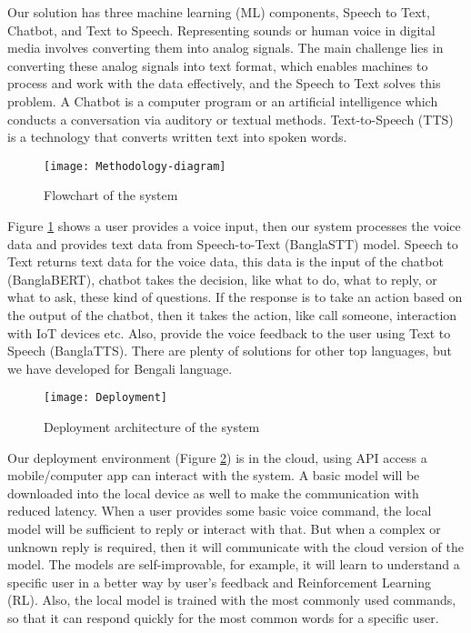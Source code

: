 Our solution has three machine learning (ML) components, Speech to Text, Chatbot, and Text to Speech.
Representing sounds or human voice in digital media involves converting them into analog signals.
The main challenge lies in converting these analog signals into text format, which enables machines to process and work with the data effectively, and the Speech to Text solves this problem\cite{speech-recog-bengali}.
A Chatbot is a computer program or an artificial intelligence which conducts a conversation via auditory or textual methods\cite{chatbot}.
Text-to-Speech (TTS) is a technology that converts written text into spoken words\cite{text-to-speech}.

\begin{figure}
    \centering
    \texttt{[image: Methodology-diagram]}
    \caption{Flowchart of the system}\label{fig:methodology}
\end{figure}

Figure \ref{fig:methodology} shows a user provides a voice input, then our system processes the voice data and provides text data from Speech-to-Text (BanglaSTT)\cite{bangla-stt} model.
Speech to Text returns text data for the voice data, this data is the input of the chatbot (BanglaBERT)\cite{bangla-bert}, chatbot takes the decision, like what to do, what to reply, or what to ask, these kind of questions.
If the response is to take an action based on the output of the chatbot, then it takes the action, like call someone, interaction with IoT devices etc.
Also, provide the voice feedback to the user using Text to Speech (BanglaTTS)\cite{bangla-tts}.
There are plenty of solutions for other top languages, but we have developed for Bengali language.

\begin{figure}
    \centering
    \texttt{[image: Deployment]}
    \caption{Deployment architecture of the system}\label{fig:deployment}
\end{figure}

Our deployment environment (Figure \ref{fig:deployment}) is in the cloud, using API access a mobile/computer app can interact with the system.
A basic model will be downloaded into the local device as well to make the communication with reduced latency.
When a user provides some basic voice command, the local model will be sufficient to reply or interact with that.
But when a complex or unknown reply is required, then it will communicate with the cloud version of the model.
The models are self-improvable, for example, it will learn to understand a specific user in a better way by user's feedback and Reinforcement Learning (RL).
Also, the local model is trained with the most commonly used commands, so that it can respond quickly for the most common words for a specific user.
